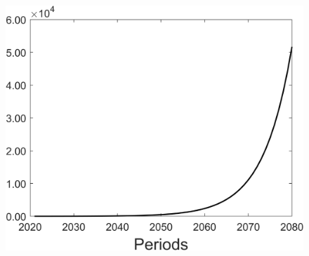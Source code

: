 \begin{figure}[h!!]
\begin{minipage}[]{0.32\textwidth}
\end{minipage}
	\begin{minipage}[]{0.32\textwidth}
		\includegraphics[width=1\textwidth]{../../codding_model/Own/figures/Rep_agent/staticBAU_LF_separate_ydyc_periods59_eppsilon4.00_zeta1.40_Ad08_Ac04_thetac0.70_thetad0.56_HetGrowth1_tauul0.181_util0_withtarget0_lgd0.png}
	\end{minipage}
\end{figure}

